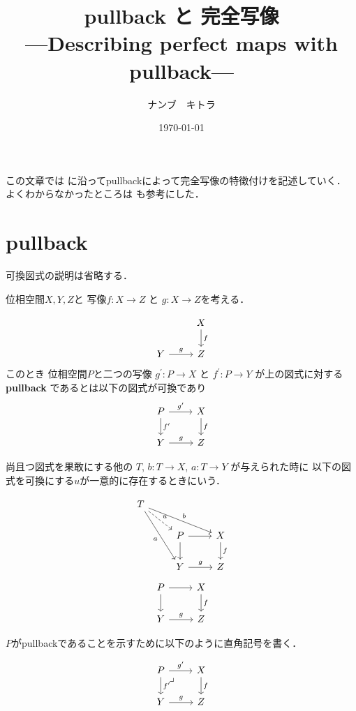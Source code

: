 \documentclass[leqno, a4paper, 12pt, dvipdfmx]{jsarticle}
\title{pullback と 完全写像\\ \large ---Describing perfect maps with pullback---}
\author{ナンブ　キトラ}
\date{\today}
\begin{document}
\maketitle

この文章では
\cite{com}
に沿ってpullbackによって完全写像の特徴付けを記述していく．
よくわからなかったところは
\cite{sta}も参考にした．

\section{pullback}

可換図式の説明は省略する．


位相空間$X, Y, Z$と
写像$f\colon X\to Z$
と
$g\colon X\to Z$を考える．

\[
\begin{tikzcd}
 & X \arrow[d,"f"] \\
Y \arrow[r,"g"] & Z
\end{tikzcd}
\]
このとき
位相空間$P$と二つの写像
$g^{\prime}\colon P\to X$
と
$f^{\prime}\colon P\to Y$
が上の図式に対する
\textbf{pullback}
であるとは以下の図式が可換であり
\[
\begin{tikzcd}
P \arrow[r, "g^{\prime}"] \arrow[d, "f^{\prime}"]
& X \arrow[d,"f"] \\
Y \arrow[r,"g"] & Z
\end{tikzcd}
\]

尚且つ図式を果敢にする他の
$T$,
$b\colon T\to X$,
$a\colon T\to  Y$
が与えられた時に
以下の図式を可換にする$u$が一意的に存在するときにいう．


\[
\begin{tikzcd}
T \arrow[ddr, "a"'] \arrow[drr, "b"] \arrow[dr, dashed, "u"] & & \\
& P \arrow[r] \arrow[d] & X \arrow[d,"f"] \\
& Y \arrow[r,"g"] & Z
\end{tikzcd}
\]
\[
\begin{tikzcd}
P \arrow[r] \arrow[d] & X \arrow[d,"f"] \\
Y \arrow[r,"g"] & Z
\end{tikzcd}
\]


$P$がpullbackであることを示すために以下のように直角記号を書く．

\[
\begin{tikzcd}
P \arrow[r, "g^{\prime}"] \arrow[d, "f^{\prime}"] \arrow[dr, phantom, "\lrcorner", very near start]
& X \arrow[d,"f"] \\
Y \arrow[r,"g"] & Z
\end{tikzcd}
\]
\end{document}
